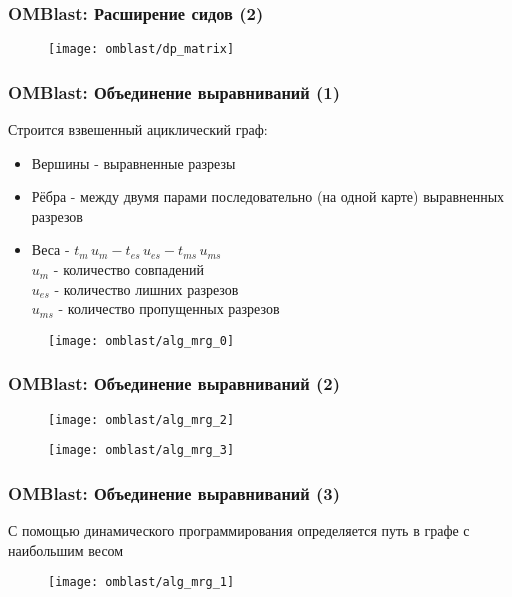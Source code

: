 \begin{frame}
\frametitle{OMBlast: Расширение сидов (2)}
  \begin{figure}
    \centering
    \texttt{[image: omblast/dp\_matrix]}
  \end{figure}
\end{frame}

\begin{frame}
\frametitle{OMBlast: Объединение выравниваний (1)}
  Строится взвешенный ациклический граф:
  \begin{itemize}
    \item Вершины - выравненные разрезы
    \item Рёбра - между двумя парами последовательно (на одной карте) выравненных разрезов
    \item Веса - $t_m \, u_m - t_{es} \, u_{es} - t_{ms} \, u_{ms}$ \\
    $u_{m}$ - количество совпадений\\
    $u_{es}$ - количество лишних разрезов\\
    $u_{ms}$ - количество пропущенных разрезов
  \end{itemize}
  \begin{figure}
    \centering
    \texttt{[image: omblast/alg\_mrg\_0]}
  \end{figure}
\end{frame}

\begin{frame}
\frametitle{OMBlast: Объединение выравниваний (2)}
  \begin{figure}
    \centering
    \texttt{[image: omblast/alg\_mrg\_2]}
  \end{figure}
  \begin{figure}
    \centering
    \texttt{[image: omblast/alg\_mrg\_3]}
  \end{figure}

\end{frame}

\begin{frame}
\frametitle{OMBlast: Объединение выравниваний (3)}
С помощью динамического программирования определяется путь в графе с наибольшим весом
  \begin{figure}
    \centering
    \texttt{[image: omblast/alg\_mrg\_1]}
  \end{figure}

\end{frame}


